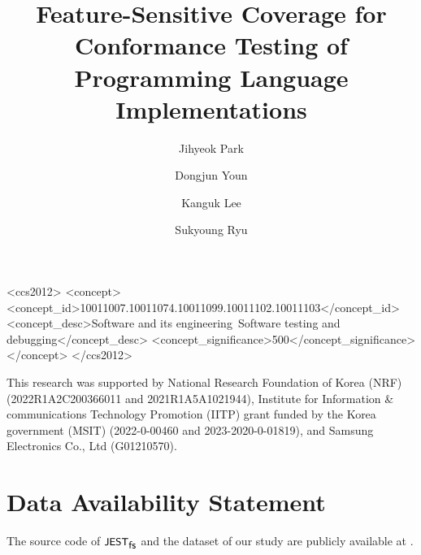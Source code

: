 \documentclass[acmsmall,screen]{acmart}
\begin{document}
\title[Feature-Sensitive Coverage for Conformance Testing]
{Feature-Sensitive Coverage for Conformance Testing of Programming Language
Implementations}

\author{Jihyeok Park}

\author{Dongjun Youn}

\author{Kanguk Lee}

\author{Sukyoung Ryu}



\begin{CCSXML}
  <ccs2012>
  <concept>
  <concept_id>10011007.10011074.10011099.10011102.10011103</concept_id>
  <concept_desc>Software and its engineering~Software testing and debugging</concept_desc>
  <concept_significance>500</concept_significance>
  </concept>
  </ccs2012>
\end{CCSXML}



\maketitle









\begin{acks}
This research was supported by National Research Foundation of Korea (NRF)
(2022R1A2C200366011 and 2021R1A5A1021944), Institute for Information \&
communications Technology Promotion (IITP) grant funded by the Korea government
(MSIT) (2022-0-00460 and 2023-2020-0-01819), and Samsung Electronics Co., Ltd
(G01210570).
\end{acks}

\section{Data Availability Statement}\label{sec:data}

The source code of $\textsf{\small JEST}_{\textsf{\small fs}}$ and the dataset of our study are publicly available
at \cite{artifact}.

\balance

\end{document}
